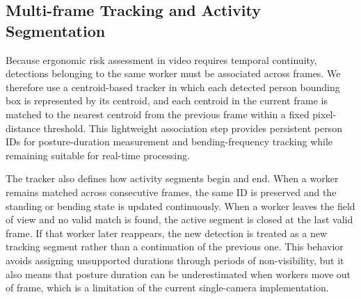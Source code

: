 \documentclass[11pt]{article}
\begin{document}
\subsection{Multi-frame Tracking and Activity Segmentation}
Because ergonomic risk assessment in video requires temporal continuity, detections belonging to the same worker must be associated across frames. We therefore use a centroid-based tracker in which each detected person bounding box is represented by its centroid, and each centroid in the current frame is matched to the nearest centroid from the previous frame within a fixed pixel-distance threshold. This lightweight association step provides persistent person IDs for posture-duration measurement and bending-frequency tracking while remaining suitable for real-time processing.

The tracker also defines how activity segments begin and end. When a worker remains matched across consecutive frames, the same ID is preserved and the standing or bending state is updated continuously. When a worker leaves the field of view and no valid match is found, the active segment is closed at the last valid frame. If that worker later reappears, the new detection is treated as a new tracking segment rather than a continuation of the previous one. This behavior avoids assigning unsupported durations through periods of non-visibility, but it also means that posture duration can be underestimated when workers move out of frame, which is a limitation of the current single-camera implementation.
\end{document}
